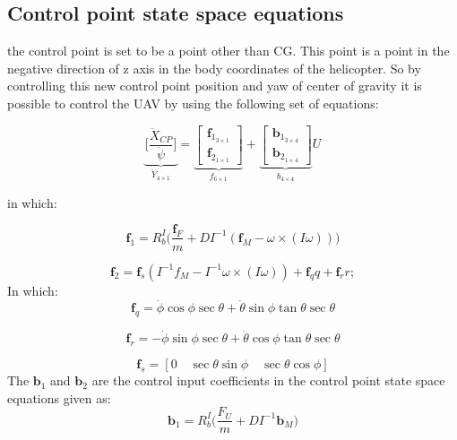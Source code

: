 \subsection{Control point state space equations}
 the control point is set to be a point other than CG. This point is a point in the negative direction of z axis in the body coordinates of the helicopter. So by controlling this new control point position and yaw of center of gravity it is possible to control the UAV by using the following set of equations:

\begin{equation}\label{eq222}
	\underbrace{\Biggl[\frac{\ddot{X}_{CP}}{\ddot{\psi}}\Biggr]}_{\ddot{Y}_{4\times 1}}
	=
	\underbrace{\left[
		\begin{array}{c}
			\textbf{f}_{1_{3\times1}} \\
			\hline
			\textbf{f}_{2_{1\times1}}
		\end{array}
		\right]
	}_{f _{6\times 1}}
	+\underbrace{\left[
		\begin{array}{c}
			\textbf{b}_{1_{3\times 4}}\\
			\hline
			\textbf{b}_{2_{1\times 4}}
		\end{array}
		\right]
	}_{b_{4\times 4}} U
\end{equation}

in which:

\begin{equation}
	\textbf{f}_1=R_b^I \big(\frac{\textbf{f}_F}{m} +DI^{-1}(\textbf{f}_M-\omega \times (I \omega))\big)
\end{equation}

\begin{equation}
	\textbf{f}_2 = \textbf{f}_s(I^{-1} f_M -I^{-1} \omega \times (I \omega))+\textbf{f}_qq+\textbf{f}_rr;
\end{equation}
In which:
\begin{equation}
	\textbf{f}_q = \dot{\phi} \cos \phi \sec \theta + \dot{\theta} \sin \phi \tan \theta \sec \theta
\end{equation}

\begin{equation}
	\textbf{f}_r = -\dot{\phi} \sin \phi \sec \theta + \dot{\theta} \cos \phi \tan \theta \sec \theta
\end{equation}

\begin{equation}
	\textbf{f}_s = [0 \quad \sec \theta \sin \phi \quad \sec\theta \cos \phi]
\end{equation}
The $\textbf{b}_1$ and $\textbf{b}_2$ are the control input coefficients in the control point state space equations given as: 
\begin{equation}
	\textbf{b}_1=R_b^I \big(\frac{F_U}{m} +DI^{-1}\textbf{b}_M\big)
\end{equation}

